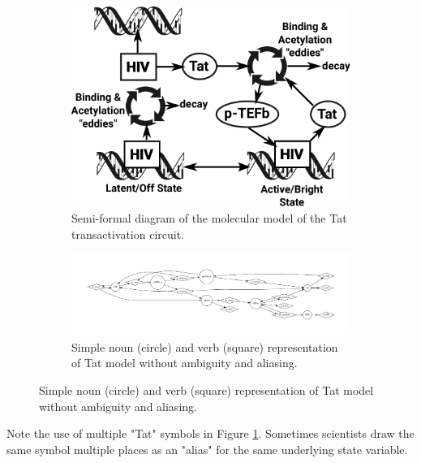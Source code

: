 \documentclass[11pt]{article}
\begin{document}
\begin{figure}
\begin{subfigure}[b]{\textwidth}
\includegraphics[width=\textwidth]{figs/HIV-Tat-figure.pdf}
\caption{Semi-formal diagram of the molecular model of the Tat transactivation circuit.}
\label{Fig:HIV-Tat}
\end{subfigure}
\begin{subfigure}[b]{\textwidth}
\includegraphics[width=\textwidth]{figs/TatModel.pdf}
\caption{Simple noun (circle) and verb (square) representation of Tat model without ambiguity and aliasing.}
\label{Fig:HIV-Tat-VDSOL}
\end{subfigure}
\end{figure}

Note the use of multiple "Tat" symbols in Figure \ref{Fig:HIV-Tat}. Sometimes scientists draw the same symbol multiple places as an "alias" for the same underlying state variable.
\end{document}
